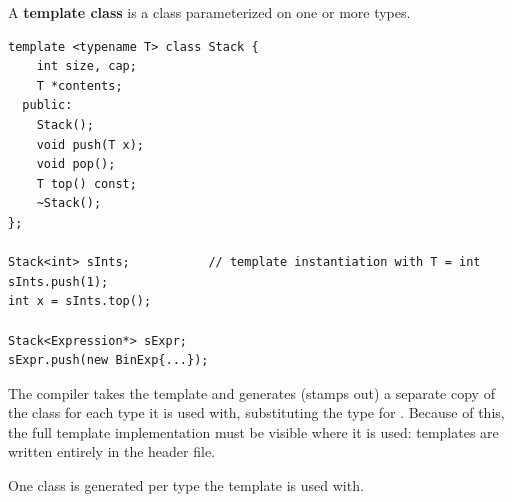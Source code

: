 \begin{definition}
A \textbf{template class} is a class parameterized on one or more types.
\end{definition}
\begin{lstlisting}[style=cpp]
template <typename T> class Stack {
    int size, cap;
    T *contents;
  public:
    Stack();
    void push(T x);
    void pop();
    T top() const;
    ~Stack();
};

Stack<int> sInts;           // template instantiation with T = int
sInts.push(1);
int x = sInts.top();

Stack<Expression*> sExpr;
sExpr.push(new BinExp{...});
\end{lstlisting}
The compiler takes the template and generates (stamps out) a separate copy of
the class for each type it is used with, substituting the type for .
Because of this, the full template implementation must be visible where it is
used: templates are written entirely in the header file.
\begin{center}

\small One class is generated per type the template is used with.
\end{center}


